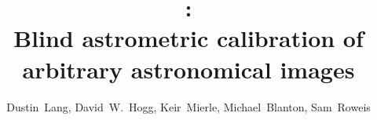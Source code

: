 \documentclass[12pt,preprint]{aastex}
\title{\an: \\
       Blind astrometric calibration of arbitrary astronomical images}
\author{Dustin~Lang\altaffilmark{1,2,3},
        David~W.~Hogg\altaffilmark{4,5},
        Keir~Mierle\altaffilmark{1,6},
        Michael~Blanton\altaffilmark{4},
        Sam~Roweis\altaffilmark{1,6}
}
\begin{document}
\maketitle



{\small


}
\end{document}

